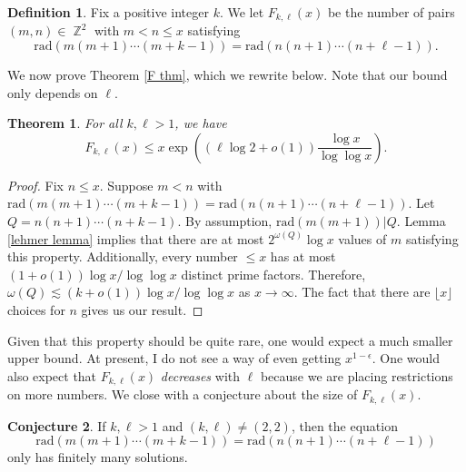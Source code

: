 \documentclass{article}
\DeclareMathOperator{\Z}{\mathbb{Z}}
\theoremstyle{plain}
\newtheorem{thm}{Theorem}
\theoremstyle{definition}
\newtheorem*{defn}{Definition}
\newtheorem{conj}[thm]{Conjecture}
\begin{document}
\begin{defn} Fix a positive integer $k$. We let $F_{k, \ell} (x)$ be the number of pairs $(m, n) \in \Z^2$ with $m < n \leq x$ satisfying
\[\textrm{rad} (m(m + 1) \cdots (m + k - 1)) = \textrm{rad} (n(n + 1) \cdots (n + \ell - 1)).\]
\end{defn}

We now prove Theorem \ref{F thm}, which we rewrite below. Note that our bound only depends on $\ell$.

\begin{thm} For all $k, \ell > 1$, we have
\[F_{k, \ell} (x) \leq x\exp\left((\ell \log 2 + o(1)) \frac{\log x}{\log \log x}\right).\]
\end{thm}

\begin{proof} Fix $n \leq x$. Suppose $m < n$ with $\textrm{rad} (m(m + 1) \cdots (m + k - 1)) = \textrm{rad} (n(n + 1) \cdots (n + \ell - 1))$. Let $Q = n(n + 1) \cdots (n + k - 1)$. By assumption, $\textrm{rad} (m(m + 1)) | Q$. Lemma \ref{lehmer lemma} implies that there are at most $2^{\omega(Q)} \log x$ values of $m$ satisfying this property. Additionally, every number $\leq x$ has at most $(1 + o(1)) \log x/\log \log x$ distinct prime factors. Therefore, $\omega(Q) \lesssim (k + o(1)) \log x/\log \log x$ as $x \to \infty$. The fact that there are $\lfloor x \rfloor$ choices for $n$ gives us our result.
\end{proof}

Given that this property should be quite rare, one would expect a much smaller upper bound. At present, I do not see a way of even getting $x^{1 - \epsilon}$. One would also expect that $F_{k, \ell} (x)$ \emph{decreases} with $\ell$ because we are placing restrictions on more numbers. We close with a conjecture about the size of $F_{k, \ell} (x)$.

\begin{conj} If $k, \ell > 1$ and $(k, \ell) \neq (2, 2)$, then the equation
\[\textrm{rad} (m(m + 1) \cdots (m + k - 1)) = \textrm{rad} (n(n + 1) \cdots (n + \ell - 1))\] 
only has finitely many solutions.
\end{conj}
\end{document}
